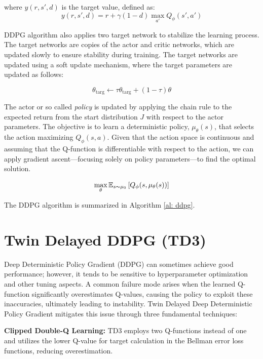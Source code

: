 where $y(r,s',d)$ is the target value, defined as:
\begin{equation*}
    y(r,s',d) = r + \gamma(1-d)\max_{a'} Q_{\phi}(s',a')
\end{equation*}

DDPG algorithm also applies two target network to stabilize the learning process. The target networks are copies of the actor and critic networks, which are updated slowly to ensure stability during training. The target networks are updated using a soft update mechanism, where the target parameters are updated as follows:

\begin{equation*}
    \theta_{\text{targ}} \leftarrow \tau\theta_{\text{targ}} + (1-\tau)\theta
\end{equation*}

The actor or so called \emph{policy} is updated by applying the chain rule to the expected return from the start distribution $J$ with respect to the actor parameters. The objective is to learn a deterministic policy, $ \mu_{\theta}(s) $, that selects the action maximizing $ Q_{\phi}(s,a) $. Given that the action space is continuous and assuming that the Q-function is differentiable with respect to the action, we can apply gradient ascent—focusing solely on policy parameters—to find the optimal solution.

\begin{equation*}
    \max_{\theta} \mathbb{E}_{s\thicksim\mu_0}\left[Q_{\phi}(s,\mu_{\theta}(s))\right]
\end{equation*}

The DDPG algorithm is summarized in Algorithm \ref{al: ddpg}.

\clearpage
\section{Twin Delayed DDPG (TD3)}
Deep Deterministic Policy Gradient (DDPG) can sometimes achieve good performance; however, it tends to be sensitive to hyperparameter optimization and other tuning aspects. A common failure mode arises when the learned Q-function significantly overestimates Q-values, causing the policy to exploit these inaccuracies, ultimately leading to instability. Twin Delayed Deep Deterministic Policy Gradient mitigates this issue through three fundamental techniques:

\textbf{Clipped Double-Q Learning:} TD3 employs two Q-functions instead of one and utilizes the lower Q-value for target calculation in the Bellman error loss functions, reducing overestimation.

